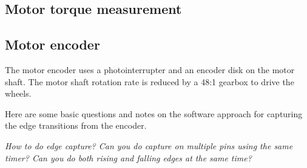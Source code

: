 \documentclass[a4paper,11pt]{article}
\begin{document}
\subsection{Motor torque measurement}

\subsection{Motor encoder}

The motor encoder uses a photointerrupter and an encoder disk on the
motor shaft. The motor shaft rotation rate is reduced by a 48:1
gearbox to drive the wheels.

Here are some basic questions and notes on the software approach for
capturing the edge transitions from the encoder.

\textit{How to do edge capture? Can you do capture on multiple pins
  using the same timer? Can you do both rising and falling edges at
  the same time?}
\end{document}
